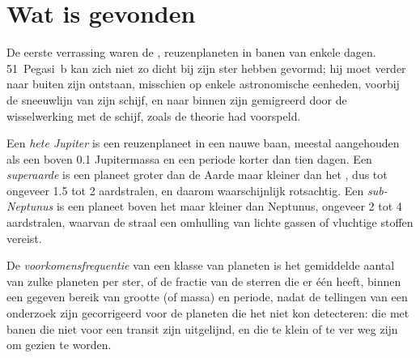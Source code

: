 
\section{Wat is gevonden}\label{sec:b3:exoplanets:found}

De eerste verrassing waren de , reuzenplaneten in banen van
enkele dagen. 51~Pegasi~b kan zich niet zo dicht bij zijn ster hebben gevormd; hij moet
verder naar buiten zijn ontstaan, misschien op enkele astronomische eenheden, voorbij de
sneeuwlijn van zijn schijf, en naar binnen zijn gemigreerd door de wisselwerking met de
schijf, zoals de theorie had voorspeld.

\begin{definition}\label{def:b3:exoplanets:classes}
Een \emph{hete Jupiter} is een reuzenplaneet in een nauwe baan,
meestal aangehouden als een  boven 0.1 Jupitermassa en een periode
korter dan tien dagen. Een \emph{superaarde} is een planeet
groter dan de Aarde maar kleiner dan het , dus tot
ongeveer 1.5 tot 2 aardstralen, en daarom waarschijnlijk rotsachtig. Een \emph{sub-Neptunus}
is een planeet boven het  maar kleiner dan Neptunus, ongeveer 2 tot
4 aardstralen, waarvan de straal een omhulling van lichte gassen of
vluchtige stoffen vereist.
\end{definition}

\begin{definition}[Voorkomensfrequentie]\label{def:b3:exoplanets:occurrence}
De \emph{voorkomensfrequentie} van een klasse van planeten is
het gemiddelde aantal van zulke planeten per ster, of de fractie van de sterren die er
één heeft, binnen een gegeven bereik van grootte (of massa) en periode, nadat de
tellingen van een onderzoek zijn gecorrigeerd voor de planeten die het niet kon detecteren:
die met banen die niet voor een transit zijn uitgelijnd, en die te klein of
te ver weg zijn om gezien te worden.
\end{definition}

